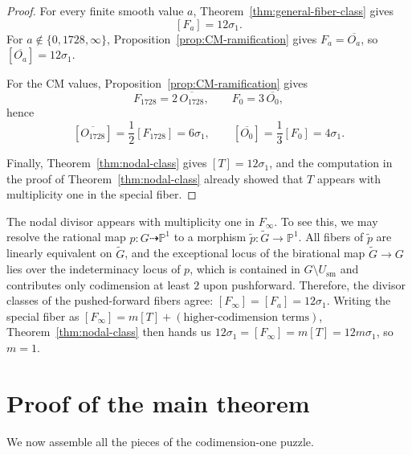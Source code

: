 \documentclass[11pt]{article}
\newcommand{\Pj}{\mathbb P}
\begin{document}
\begin{proof}
For every finite smooth value $a$, Theorem~\ref{thm:general-fiber-class} gives
\[
[F_a]=12\sigma_1.
\]
For $a\notin\{0,1728,\infty\}$, Proposition~\ref{prop:CM-ramification} gives
$F_a=\overline{O_a}$, so $[\overline{O_a}]=12\sigma_1$.

For the CM values, Proposition~\ref{prop:CM-ramification} gives
\[
F_{1728}=2\,\overline{O_{1728}},
\qquad
F_0=3\,\overline{O_0},
\]
hence
\[
[\overline{O_{1728}}]=\frac{1}{2}[F_{1728}]=6\sigma_1,
\qquad
[\overline{O_0}]=\frac{1}{3}[F_0]=4\sigma_1.
\]

Finally, Theorem~\ref{thm:nodal-class} gives $[T]=12\sigma_1$, and the computation in
the proof of Theorem~\ref{thm:nodal-class} already showed that $T$ appears with multiplicity
one in the special fiber.
\end{proof}

The nodal divisor appears with multiplicity one in $F_\infty$. To see this, we may resolve the rational map $p\colon G\dashrightarrow \Pj^1$ to a morphism
$\widetilde p\colon \widetilde G\to \Pj^1$.
All fibers of $\widetilde p$ are linearly equivalent on $\widetilde G$, and the exceptional locus of the birational map $\widetilde G\to G$ lies over the indeterminacy locus of $p$, which is contained in $G\setminus U_{\mathrm{sm}}$ and contributes only codimension at least $2$ upon pushforward. Therefore, the divisor classes of the pushed-forward fibers agree:
$[F_\infty]=[F_a]=12\sigma_1$.
Writing the special fiber as
$[F_\infty]=m[T]+(\text{higher-codimension terms})$,
Theorem~\ref{thm:nodal-class} then hands us
$12\sigma_1=[F_\infty]=m[T]=12m\sigma_1$,
so $m=1$.

\section{Proof of the main theorem}

We now assemble all the pieces of the codimension-one puzzle.
\end{document}
